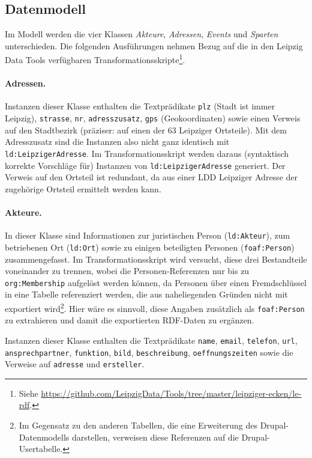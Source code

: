 \documentclass[a4paper,11pt]{article}
\begin{document}
\subsection{Datenmodell}

Im Modell werden die vier Klassen \emph{Akteure}, \emph{Adressen},
\emph{Events} und \emph{Sparten} unterschieden.  Die folgenden Ausführungen
nehmen Bezug auf die in den Leipzig Data Tools verfügbaren
Transformationsskripte\footnote{Siehe
  \url{https://github.com/LeipzigData/Tools/tree/master/leipziger-ecken/le-rdf}.}. 

\paragraph{Adressen.}
Instanzen dieser Klasse enthalten die Textprädikate \texttt{plz} (Stadt ist
immer Leipzig), \texttt{strasse}, \texttt{nr}, \texttt{adresszusatz},
\texttt{gps} (Geokoordinaten) sowie einen Verweis auf den Stadtbezirk
(präziser: auf einen der 63 Leipziger Ortsteile).  Mit dem Adresszusatz sind
die Instanzen also nicht ganz identisch mit \texttt{ld:LeipzigerAdresse}. Im
Transformationsskript werden daraus (syntaktisch korrekte Vorschläge für)
Instanzen von \texttt{ld:LeipzigerAdresse} generiert.  Der Verweis auf den
Ortsteil ist redundant, da aus einer LDD Leipziger Adresse der zugehörige
Ortsteil ermittelt werden kann. 

\paragraph{Akteure.}
In dieser Klasse sind Informationen zur juristischen Person
(\texttt{ld:Akteur}), zum betriebenen Ort (\texttt{ld:Ort}) sowie zu einigen
beteiligten Personen (\texttt{foaf:Person}) zusammengefasst.  Im
Transformationsskript wird versucht, diese drei Bestandteile voneinander zu
trennen, wobei die Personen-Referenzen nur bis zu \texttt{org:Membership}
aufgelöst werden können, da Personen über einen Fremdschlüssel in eine Tabelle
referenziert werden, die aus naheliegenden Gründen nicht mit exportiert
wird\footnote{Im Gegensatz zu den anderen Tabellen, die eine Erweiterung des
  Drupal-Datenmodells darstellen, verweisen diese Referenzen auf die
  Drupal-Usertabelle.}. Hier wäre es sinnvoll, diese Angaben zusätzlich als
\texttt{foaf:Person} zu extrahieren und damit die exportierten RDF-Daten zu
ergänzen.

Instanzen dieser Klasse enthalten die Textprädikate \texttt{name},
\texttt{email}, \texttt{telefon}, \texttt{url}, \texttt{ansprech\-partner},
\texttt{funktion}, \texttt{bild}, \texttt{beschreibung},
\texttt{oeffnungszeiten} sowie die Verweise auf \texttt{adresse} und
\texttt{ersteller}.
\end{document}
